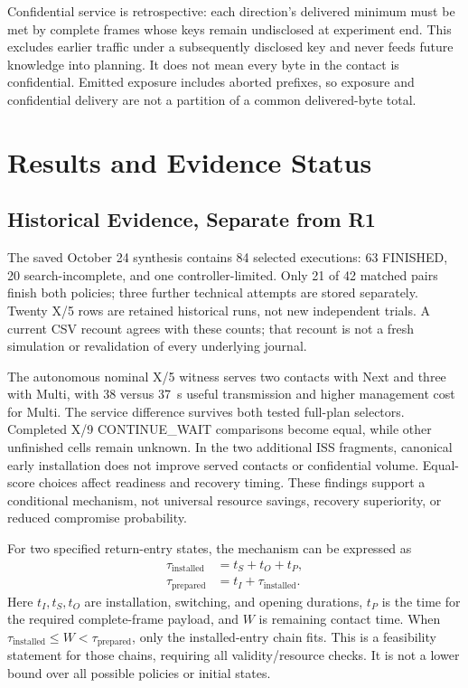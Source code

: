 \documentclass[conference]{IEEEtran}
\begin{document}
Confidential service is retrospective: each direction's delivered minimum must be met by complete frames whose keys remain undisclosed at experiment end. This excludes earlier traffic under a subsequently disclosed key and never feeds future knowledge into planning. It does not mean every byte in the contact is confidential. Emitted exposure includes aborted prefixes, so exposure and confidential delivery are not a partition of a common delivered-byte total.

\section{Results and Evidence Status}
\subsection{Historical Evidence, Separate from R1}
The saved October 24 synthesis contains 84 selected executions: 63 FINISHED, 20 search-incomplete, and one controller-limited. Only 21 of 42 matched pairs finish both policies; three further technical attempts are stored separately. Twenty X/5 rows are retained historical runs, not new independent trials. A current CSV recount agrees with these counts; that recount is not a fresh simulation or revalidation of every underlying journal.

The autonomous nominal X/5 witness serves two contacts with Next and three with Multi, with 38 versus 37~s useful transmission and higher management cost for Multi. The service difference survives both tested full-plan selectors. Completed X/9 CONTINUE\_WAIT comparisons become equal, while other unfinished cells remain unknown. In the two additional ISS fragments, canonical early installation does not improve served contacts or confidential volume. Equal-score choices affect readiness and recovery timing. These findings support a conditional mechanism, not universal resource savings, recovery superiority, or reduced compromise probability.

For two specified return-entry states, the mechanism can be expressed as
\begin{align}
\tau_{\mathrm{installed}}&=t_S+t_O+t_P,\\
\tau_{\mathrm{prepared}}&=t_I+\tau_{\mathrm{installed}}.
\end{align}
Here $t_I,t_S,t_O$ are installation, switching, and opening durations, $t_P$ is the time for the required complete-frame payload, and $W$ is remaining contact time. When $\tau_{\mathrm{installed}}\leq W<\tau_{\mathrm{prepared}}$, only the installed-entry chain fits. This is a feasibility statement for those chains, requiring all validity/resource checks. It is not a lower bound over all possible policies or initial states.
\end{document}
